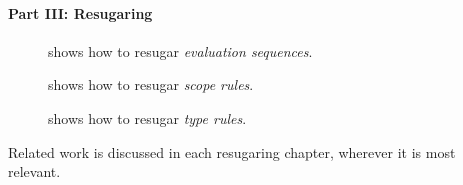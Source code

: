\paragraph{Part III: Resugaring}
\begin{description}
\item[] shows how to resugar \emph{evaluation sequences}.
\item[] shows how to resugar \emph{scope rules}.
\item[] shows how to resugar \emph{type rules}.
\end{description}

Related work is discussed in each resugaring chapter, wherever it is most relevant.
